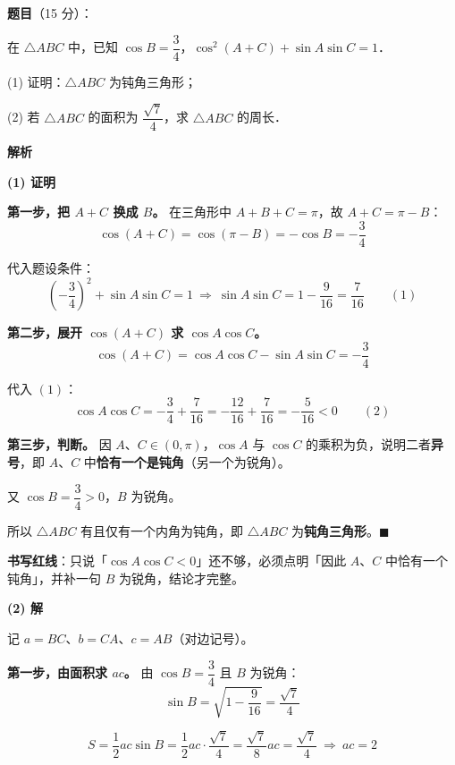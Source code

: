 \begin{answer}

\textbf{题目}（15 分）：

在 $\triangle ABC$ 中，已知 $\cos B=\dfrac{3}{4}$，$\cos^2(A+C)+\sin A\sin C=1$．

  (1) 证明：$\triangle ABC$ 为钝角三角形；

  (2) 若 $\triangle ABC$ 的面积为 $\dfrac{\sqrt{7}}{4}$，求 $\triangle ABC$ 的周长．

\textbf{解析}

\par\medskip

\textbf{(1) 证明}

\textbf{第一步，把 $A+C$ 换成 $B$。} 在三角形中 $A+B+C=\pi$，故 $A+C=\pi-B$：
\nopagebreak[4]
\[\cos(A+C)=\cos(\pi-B)=-\cos B=-\frac34\]

代入题设条件：
\nopagebreak[4]
\[\left(-\frac34\right)^2+\sin A\sin C=1\ \Longrightarrow\ \sin A\sin C=1-\frac{9}{16}=\frac{7}{16}\qquad(1)\]

\textbf{第二步，展开 $\cos(A+C)$ 求 $\cos A\cos C$。}
\nopagebreak[4]
\[\cos(A+C)=\cos A\cos C-\sin A\sin C=-\frac34\]

代入 $(1)$：
\nopagebreak[4]
\[\cos A\cos C=-\frac34+\frac{7}{16}=-\frac{12}{16}+\frac{7}{16}=-\frac{5}{16}<0\qquad(2)\]

\textbf{第三步，判断。} 因 $A$、$C\in(0,\pi)$，$\cos A$ 与 $\cos C$ 的乘积为负，说明二者\textbf{异号}，即 $A$、$C$ 中\textbf{恰有一个是钝角}（另一个为锐角）。

又 $\cos B=\dfrac34>0$，$B$ 为锐角。

所以 $\triangle ABC$ 有且仅有一个内角为钝角，即 $\triangle ABC$ 为\textbf{钝角三角形}。$\blacksquare$

\begin{gktip}
\textbf{书写红线}：只说「$\cos A\cos C<0$」还不够，必须点明「因此 $A$、$C$ 中恰有一个钝角」，并补一句 $B$ 为锐角，结论才完整。
\end{gktip}

\par\medskip

\textbf{(2) 解}

记 $a=BC$、$b=CA$、$c=AB$（对边记号）。

\textbf{第一步，由面积求 $ac$。} 由 $\cos B=\dfrac34$ 且 $B$ 为锐角：
\nopagebreak[4]
\[\sin B=\sqrt{1-\frac{9}{16}}=\frac{\sqrt7}{4}\]

\nopagebreak[4]
\[S=\frac12ac\sin B=\frac12ac\cdot\frac{\sqrt7}{4}=\frac{\sqrt7}{8}ac=\frac{\sqrt7}{4}\ \Longrightarrow\ ac=2\]


\end{answer}
